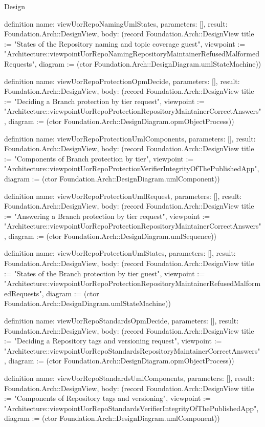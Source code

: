 \begin{lexlean}{Design}
\begin{semanticmodule}
definition{
  name: viewUorRepoNamingUmlStates,
  parameters: [],
  result: Foundation.Arch::DesignView,
  body: (record Foundation.Arch::DesignView {title := "States of the Repository naming and topic coverage guest", viewpoint := "Architecture::viewpointUorRepoNamingRepositoryMaintainerRefusedMalformedRequests", diagram := (ctor Foundation.Arch::DesignDiagram.umlStateMachine)})
}

definition{
  name: viewUorRepoProtectionOpmDecide,
  parameters: [],
  result: Foundation.Arch::DesignView,
  body: (record Foundation.Arch::DesignView {title := "Deciding a Branch protection by tier request", viewpoint := "Architecture::viewpointUorRepoProtectionRepositoryMaintainerCorrectAnswers", diagram := (ctor Foundation.Arch::DesignDiagram.opmObjectProcess)})
}

definition{
  name: viewUorRepoProtectionUmlComponents,
  parameters: [],
  result: Foundation.Arch::DesignView,
  body: (record Foundation.Arch::DesignView {title := "Components of Branch protection by tier", viewpoint := "Architecture::viewpointUorRepoProtectionVerifierIntegrityOfThePublishedApp", diagram := (ctor Foundation.Arch::DesignDiagram.umlComponent)})
}

definition{
  name: viewUorRepoProtectionUmlRequest,
  parameters: [],
  result: Foundation.Arch::DesignView,
  body: (record Foundation.Arch::DesignView {title := "Answering a Branch protection by tier request", viewpoint := "Architecture::viewpointUorRepoProtectionRepositoryMaintainerCorrectAnswers", diagram := (ctor Foundation.Arch::DesignDiagram.umlSequence)})
}

definition{
  name: viewUorRepoProtectionUmlStates,
  parameters: [],
  result: Foundation.Arch::DesignView,
  body: (record Foundation.Arch::DesignView {title := "States of the Branch protection by tier guest", viewpoint := "Architecture::viewpointUorRepoProtectionRepositoryMaintainerRefusedMalformedRequests", diagram := (ctor Foundation.Arch::DesignDiagram.umlStateMachine)})
}

definition{
  name: viewUorRepoStandardsOpmDecide,
  parameters: [],
  result: Foundation.Arch::DesignView,
  body: (record Foundation.Arch::DesignView {title := "Deciding a Repository tags and versioning request", viewpoint := "Architecture::viewpointUorRepoStandardsRepositoryMaintainerCorrectAnswers", diagram := (ctor Foundation.Arch::DesignDiagram.opmObjectProcess)})
}

definition{
  name: viewUorRepoStandardsUmlComponents,
  parameters: [],
  result: Foundation.Arch::DesignView,
  body: (record Foundation.Arch::DesignView {title := "Components of Repository tags and versioning", viewpoint := "Architecture::viewpointUorRepoStandardsVerifierIntegrityOfThePublishedApp", diagram := (ctor Foundation.Arch::DesignDiagram.umlComponent)})
}


\end{semanticmodule}
\end{lexlean}
